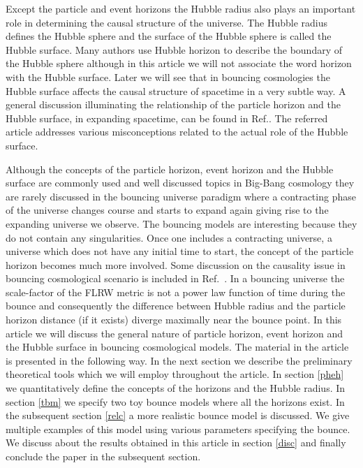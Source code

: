 \documentclass[24pt]{article}
\begin{document}
Except the particle and event horizons the Hubble radius also plays an
important role\cite{Lewis:2012yk, Harrison:1991dv} in determining the
causal structure of the universe.  The Hubble radius defines the
Hubble sphere and the surface of the Hubble sphere is called the
Hubble surface.  Many authors use Hubble horizon to describe the
boundary of the Hubble sphere although in this article we will not
associate the word horizon with the Hubble surface.  Later we will see
that in bouncing cosmologies the Hubble surface affects the causal
structure of spacetime in a very subtle way.  A general discussion
illuminating the relationship of the particle horizon and the Hubble
surface, in expanding spacetime, can be found in
Ref.\cite{Davis:2003ad}. The referred article addresses various
misconceptions related to the actual role of the Hubble surface.

Although the concepts of the particle horizon, event horizon and the
Hubble surface are commonly used and well discussed topics in Big-Bang
cosmology\cite{Ellis:2015wdi, Margalef-Bentabol:2012kwa,
  MargalefBentabol:2013bh} they are rarely discussed in the bouncing
universe paradigm where a contracting phase of the universe changes
course and starts to expand again giving rise to the expanding
universe we observe. The bouncing models are interesting because they
do not contain any singularities\cite{Brandenberger:2016vhg,
  Novello:2008ra, Martin:2004pm, Brandenberger:2012zb,
  Cai:2012va}. Once one includes a contracting universe, a universe
which does not have any initial time to start, the concept of the
particle horizon becomes much more involved. Some discussion on the
causality issue in bouncing cosmological scenario is included in
Ref.~\cite{Martin:2003bp}. In a bouncing universe the scale-factor of
the FLRW metric is not a power law function of time during the bounce
and consequently the difference between Hubble radius and the particle
horizon distance (if it exists) diverge maximally near the bounce
point. In this article we will discuss the general nature of particle
horizon, event horizon and the Hubble surface in bouncing cosmological
models. The material in the article is presented in the following way.
In the next section we describe the preliminary theoretical tools
which we will employ throughout the article. In section \ref{pheh} we
quantitatively define the concepts of the horizons and the Hubble
radius.  In section \ref{tbm} we specify two toy bounce models where
all the horizons exist. In the subsequent section \ref{relc} a more
realistic bounce model is discussed. We give multiple examples of this
model using various parameters specifying the bounce.  We discuss
about the results obtained in this article in section \ref{disc} and
finally conclude the paper in the subsequent section.
\end{document}
